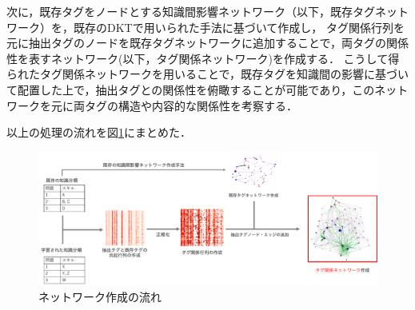 次に，既存タグをノードとする知識間影響ネットワーク（以下，既存タグネットワーク）を，既存のDKTで用いられた手法に基づいて作成し，
タグ関係行列を元に抽出タグのノードを既存タグネットワークに追加することで，両タグの関係性を表すネットワーク(以下，タグ関係ネットワーク)を作成する．
こうして得られたタグ関係ネットワークを用いることで，既存タグを知識間の影響に基づいて配置した上で，抽出タグとの関係性を俯瞰することが可能であり，このネットワークを元に両タグの構造や内容的な関係性を考察する．

以上の処理の流れを図\ref{fig:networkflow}にまとめた．

\begin{figure}[htb]
\begin{center}
\includegraphics[width=400pt]{./img/networkflow2.pdf}
\end{center}
\caption{ネットワーク作成の流れ}
\label{fig:networkflow}
\end{figure}



